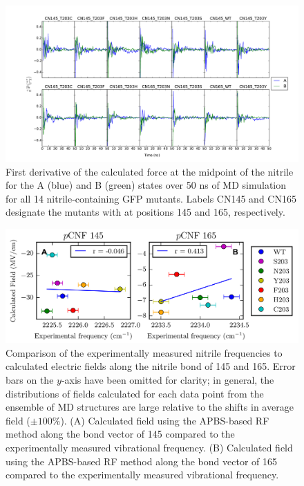 \begin{figure}
    \center
    \includegraphics[width=\double]{figures-gfp-pKa/force_APBS_firstDerivative.pdf}
    \caption{
        First derivative of the calculated force at the midpoint of the nitrile for the A (blue) and B (green) states over 50 ns of MD simulation for all 14 nitrile-containing GFP mutants. 
        Labels CN145 and CN165 designate the mutants with \pCNF{} at positions 145 and 165, respectively.
    }
    \label{fig:force_1stD}
\end{figure}

\begin{figure}
    \center
    \includegraphics[width=\double]{figures-gfp-pKa/calc_forces.png}
    \caption{
        Comparison of the experimentally measured nitrile frequencies to calculated electric fields along the nitrile bond of \pCNF{} 145 and 165. 
        Error bars on the $y$-axis have been omitted for clarity; 
        in general, the distributions of fields calculated for each data point from the ensemble of MD structures are large relative to the shifts in average field ($\pm100\%$). 
        (A) Calculated field using the APBS-based RF method along the bond vector of \pCNF{} 145 compared to the experimentally measured vibrational frequency. 
        (B) Calculated field using the APBS-based RF method along the bond vector of \pCNF{} 165 compared to the experimentally measured vibrational frequency.
    }
    \label{fig:calc_forces}
\end{figure}

